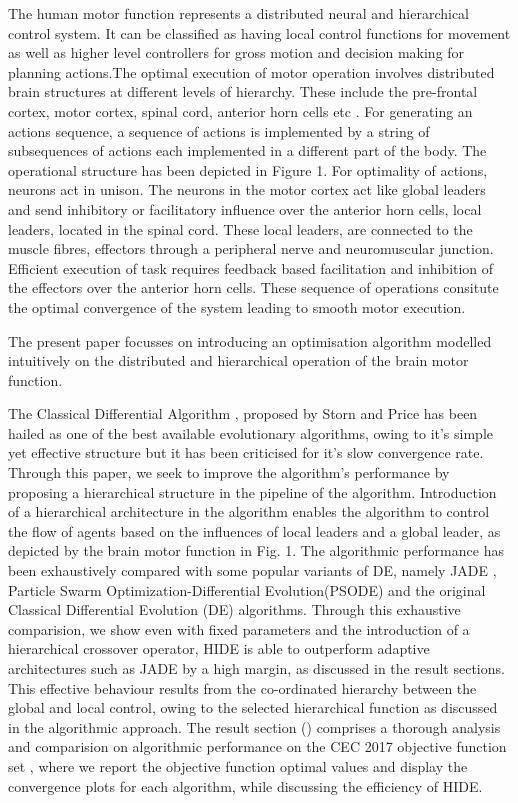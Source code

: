 The human motor function represents a distributed neural and hierarchical control system. It can be classified as having local control functions for movement as well as higher level controllers for gross motion and decision making for planning actions.The optimal execution of motor operation involves distributed brain structures at different levels of hierarchy. These include the pre-frontal cortex, motor cortex, spinal cord, anterior horn cells etc \cite{Shaw1982119}. For generating an actions sequence, a sequence of actions is implemented by a string of subsequences of actions each implemented in a different part of the body. The operational structure has been depicted in Figure 1\cite{passino2005biomimicry}.
For optimality of actions, neurons act in unison. The neurons in the motor cortex act like global leaders and send inhibitory or facilitatory influence over the anterior horn cells, local leaders, located in the spinal cord\cite{Shaw1982119}. These local leaders, are connected to the muscle fibres, effectors through a peripheral nerve and neuromuscular junction.
Efficient execution of task requires feedback based facilitation and inhibition of the effectors over the anterior horn cells. These sequence of operations consitute the optimal convergence of the system leading to smooth motor execution.


The present paper focusses on introducing an optimisation algorithm modelled intuitively on the distributed and hierarchical operation of the brain motor function.     

The Classical Differential Algorithm \cite{storn1995differential}, proposed by Storn and Price has been hailed as one of the best available evolutionary algorithms, owing to it's simple yet effective structure but it has been criticised for it's slow convergence rate. Through this paper, we seek to improve the algorithm's performance by proposing a hierarchical structure in the pipeline of the algorithm. Introduction of a hierarchical architecture in the algorithm enables the algorithm to control the flow of agents based on the influences of local leaders and a global leader, as depicted by the brain motor function in Fig. 1. The algorithmic performance has been exhaustively compared with some popular variants of DE, namely JADE \cite{zhang2009jade}, Particle Swarm Optimization-Differential Evolution(PSODE) and the original Classical Differential Evolution (DE) algorithms. Through this exhaustive comparision, we show even with fixed parameters and the introduction of a hierarchical crossover operator, HIDE is able to outperform adaptive architectures such as JADE by a high margin, as discussed in the result sections. This effective behaviour results from the co-ordinated hierarchy between the global and local control, owing to the selected hierarchical function as discussed in the algorithmic approach. The result section () comprises a thorough analysis and comparision on algorithmic performance on the CEC 2017 objective function set \cite{cec2017benchmark}, where we report the objective function optimal values and display the convergence plots for each algorithm, while discussing the efficiency of HIDE.



